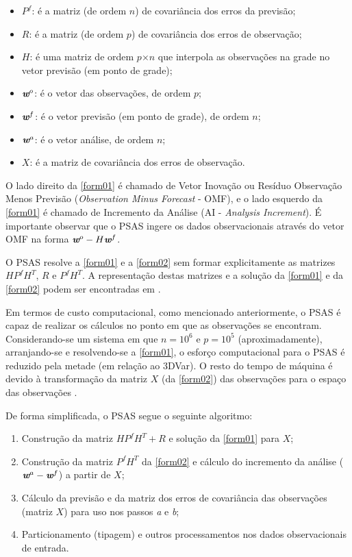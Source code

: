 \begin{itemize}
\item $P^{f}$: é a matriz (de ordem $n$) de covariância dos erros da previsão;
\item $R$: é a matriz (de ordem $p$) de covariância dos erros de observação;
\item $H$: é uma matriz de ordem $p$$\times$$n$ que interpola as observações na grade no vetor previsão (em ponto de grade);
\item $\textit{\textbf{w}}^o$: é o vetor das observações, de ordem $p$;
\item $\textit{\textbf{w}}^f$: é o vetor previsão (em ponto de grade), de ordem $n$;
\item $\textit{\textbf{w}}^a$: é o vetor análise, de ordem $n$;
\item $\textit{X}$: é a matriz de covariância dos erros de observação.
\end{itemize}

O lado direito da \autoref{form01} é chamado de Vetor Inovação ou Resíduo Observação Menos Previsão (\textit{Observation Minus Forecast} - OMF), e o lado esquerdo da \autoref{form01} é chamado de Incremento da Análise (AI - \textit{Analysis Increment}). É importante observar que o PSAS ingere os dados observacionais através do vetor OMF na forma $\textit{\textbf{w}}^o-H\textit{\textbf{w}}^f$.

O PSAS resolve a \autoref{form01} e a \autoref{form02} sem formar explicitamente as matrizes $HP^{f}H^{T}$, $R$ e $P^{f}H^{T}$. A representação destas matrizes e a solução da \autoref{form01} e da \autoref{form02} podem ser encontradas em .

Em termos de custo computacional, como mencionado anteriormente, o PSAS é capaz de realizar os cálculos no ponto em que as observações se encontram. Considerando-se um sistema em que $n=10^{6}$ e $p=10^{5}$ (aproximadamente), arranjando-se e resolvendo-se a \autoref{form01}, o esforço computacional para o PSAS é reduzido pela metade (em relação ao 3DVar). O resto do tempo de máquina é devido à transformação da matriz $X$ (da \autoref{form02}) das observações para o espaço das observações \cite{cohnetal98}.

De forma simplificada, o PSAS segue o seguinte algoritmo:

\begin{enumerate}
\item Construção da matriz $HP^{f}H^{T}+R$ e solução da \autoref{form01} para $X$;
\item Construção da matriz $P^{f}H^{T}$ da \autoref{form02} e cálculo do incremento da análise ($\textit{\textbf{w}}^a-\textit{\textbf{w}}^f$) a partir de $X$;
\item Cálculo da previsão e da matriz dos erros de covariância das observações (matriz $X$) para uso nos passos \textit{a} e \textit{b};
\item Particionamento (tipagem) e outros processamentos nos dados observacionais de entrada.
\end{enumerate}

